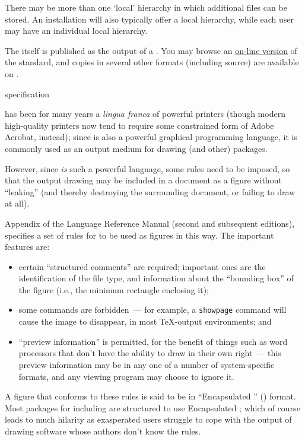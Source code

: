 There may be more than one `local' hierarchy in which additional files
can be stored.  An installation will also typically offer a local
hierarchy, while each user may have an individual local hierarchy.

The  itself is published as the output of a  %
.  You may browse an
\href{http://tug.org/tds/}{on-line version} of the standard, and
copies in several other formats (including source) are available on
.
\begin{ctanrefs}
\item[\nothtml{\rmfamily}\acro{TDS} specification]
\end{ctanrefs}


\PS{} has been for many years a \emph{lingua franca} of powerful
printers (though modern high-quality printers now tend to require some
constrained form of Adobe Acrobat, instead); since \PS{} is also a
powerful graphical programming language, it is commonly used as an
output medium for drawing (and other) packages.

However, since \PS{} \emph{is} such a powerful language, some
rules need to be imposed, so that the output drawing may be included
in a document as a figure without ``leaking'' (and thereby destroying
the surrounding document, or failing to draw at all).

Appendix  of the \PS{} Language Reference Manual (second
and subsequent editions), specifies a set of rules for \PS{} to
be used as figures in this way.  The important features are:
\begin{itemize}
\item certain ``structured comments'' are required; important ones are
  the identification of the file type, and information about the
  ``bounding box'' of the figure (i.e., the minimum rectangle
  enclosing it);
\item some commands are forbidden~--- for example, a \texttt{showpage}
  command will cause the image to disappear, in most \TeX{}-output
  environments; and
\item ``preview information'' is permitted, for the benefit of things
  such as word processors that don't have the ability to draw
  \PS{} in their own right~--- this preview information may be in
  any one of a number of system-specific formats, and any viewing
  program may choose to ignore it.
\end{itemize}
A \PS{} figure that conforms to these rules is said to be in
``Encapsulated \PS{}'' () format.  Most \AllTeX{} packages for
including \PS{} are structured to use Encapsulated \PS{};
which of course leads to much hilarity as exasperated \AllTeX{} users
struggle to cope with the output of drawing software whose authors
don't know the rules.

